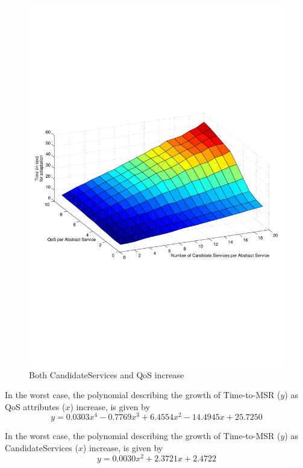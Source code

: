 \documentclass[10pt,journal,compsoc]{IEEEtran}
\begin{document}
\begin{figure}[htbp]
\centering
\includegraphics[clip, trim=0.5cm 8cm 1cm 9cm, scale=0.45]{graphs/scaling_time_svcs_qos.pdf}
\caption{Both CandidateServices and QoS increase \label{fig:svc_and_qos_scaling}}
\end{figure}

In the worst case, the polynomial describing the growth of Time-to-MSR ($y$) as QoS attributes ($x$) increase, is given by
\begin{equation}
    y =  0.0303x^{4}  - 0.7769x^{3} +   6.4554x^{2} - 14.4945x +  25.7250 \label{eq:qos_vs_cand}
\end{equation}

In the worst case, the polynomial describing the growth of Time-to-MSR ($y$) as CandidateServices ($x$) increase, is given by
\begin{equation}
    y =  0.0030x^{2} +    2.3721x  +  2.4722 \label{eq:cand_vs_qos}
\end{equation}
\end{document}

